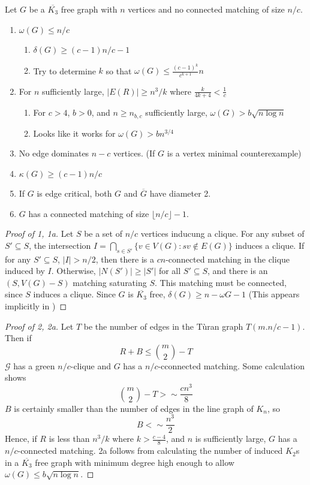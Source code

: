 \documentclass[12pt]{article}
\newcommand{\kfree}{$\overline{K_3}$ free\xspace}
\begin{document}
	\noindent Let $G$ be a \kfree graph with $n$ vertices and no connected matching of size $n/c$.
	\begin{enumerate}
		\item $\omega(G) \leq n/c$
			\begin{enumerate}
				\item $\delta(G) \geq (c-1)n/c-1$
				\item Try to determine $k$ so that $\omega(G) \leq \frac{(c-1)^k}{c^{k+1}}n$
			\end{enumerate}    
		\item For $n$ sufficiently large, $|E(R)|\geq n^3/k$ where  $\frac{k}{4k+4} < \frac{1}{c}$ 
			\begin{enumerate}
			\item For $c > 4$, $b >0$, and $n \geq n_{b,c}$ sufficiently large, $\omega(G) > b\sqrt{n\log n}$
			\item Looks like it works for $\omega(G) > bn^{3/4}$
			\end{enumerate}
		\item No edge dominates $n-c$ vertices. (If $G$ is a vertex minimal counterexample)
		\item $\kappa(G) \geq (c-1)n/c$
		\item If $G$ is edge critical, both $G$ and $\overline{G}$ have diameter 2.
		\item $G$ has a connected matching of size $\lfloor n/c \rfloor -1 .$
	\end{enumerate}

\begin{proof}[Proof of 1, 1a]
	Let $S$ be a set of $n/c$ vertices inducung a clique.  For any subset of $S'\subseteq S$, the intersection $\displaystyle I = \bigcap_{s\in S'} \{v \in V(G): sv \notin E(G)\}$ induces a clique.  If for any $S'\subseteq S$, $|I| > n/2$, then there is a $cn$-connected matching in the clique induced by $I$.  Otherwise, $|N(S')| \geq |S'|$ for all $S'\subseteq S$, and there is an $(S,V(G)-S)$ matching saturating $S$.  This matching must be connected, since $S$ induces a clique. Since $G$ is \kfree, $\delta(G) \geq n-\omega{G}-1$ (This appears implicitly in \cite{FGS})
\end{proof}

\begin{proof}[Proof of 2, 2a]
Let $T$ be the number of edges in the T\`uran graph $T(m. n/c-1)$.  Then if 
\[R+B \leq {m\choose 2} - T\]
$\mathcal{G}$ has a green $n/c$-clique and $G$ has a $n/c$-cconnected matching. Some calculation shows \[{m\choose 2} - T >\sim \frac{cn^3}{8}\]
$B$ is certainly smaller than the number of edges in the line graph of $K_n$, so 
\[B < \sim \frac{n^3}{2}\]
Hence, if $R$ is less than $n^3/k$ where  $k > \frac{c-4}{8}$, and $n$ is sufficiently large, $G$ has a $n/c$-connected matching.  2a follows from calculating the number of induced $K_2$s in a \kfree graph with minimum degree high enough to allow $\omega(G) \leq b\sqrt{n\log n}$.
\end{proof}
\end{document}
